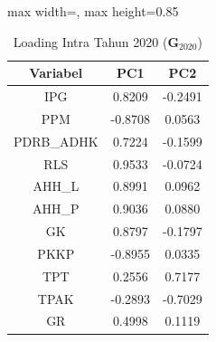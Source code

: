 \begin{table}[H]
\centering
\caption{Loading Intra Tahun 2020 ($\mathbf{G}_{2020}$)} \label{tab:loading_intra_2020}
\begin{adjustbox}{max width=\textwidth, max height=0.85\textheight}
\begin{tabular}{|c|c|c|}
\hline
\textbf{Variabel} & \textbf{PC1} & \textbf{PC2} \\
\hline
IPG & 0.8209 & -0.2491 \\
PPM & -0.8708 & 0.0563 \\
PDRB\_ADHK & 0.7224 & -0.1599 \\
RLS & 0.9533 & -0.0724 \\
AHH\_L & 0.8991 & 0.0962 \\
AHH\_P & 0.9036 & 0.0880 \\
GK & 0.8797 & -0.1797 \\
PKKP & -0.8955 & 0.0335 \\
TPT & 0.2556 & 0.7177 \\
TPAK & -0.2893 & -0.7029 \\
GR & 0.4998 & 0.1119 \\
\hline
\end{tabular}
\end{adjustbox}
\end{table}